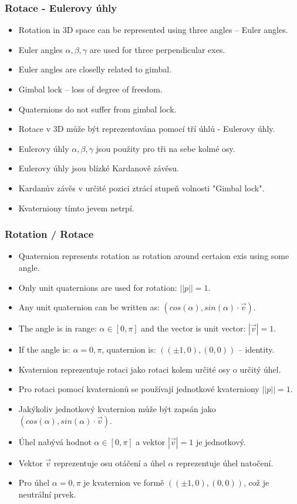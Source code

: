 \begin{frame}\frametitle{Rotace - Eulerovy úhly}\scriptsize
\begin{itemize}
\item Rotation in 3D space can be represented using three angles -- Euler angles.
\item Euler angles $\alpha,\beta,\gamma$ are used for three perpendicular exes.
\item Euler angles are closelly related to gimbal.
\item Gimbal lock -- loss of degree of freedom.
\item Quaternions do not suffer from gimbal lock.
\end{itemize}
\begin{itemize}
\item Rotace v 3D může být reprezentována pomocí tří úhlů - Eulerovy úhly.
\item Eulerovy úhly $\alpha,\beta,\gamma$ jsou použity pro tři na sebe kolmé osy.
\item Eulerovy úhly jsou blízké Kardanově závěsu.
\item Kardanův závěs v určité pozici ztrácí stupeň volnosti "Gimbal lock".
\item Kvaterniony tímto jevem netrpí.
\end{itemize}
\end{frame}

\begin{frame}\frametitle{Rotation / Rotace}\scriptsize
\begin{itemize}
\item Quaternion represents rotation as rotation around certaion exis using some angle.
\item Only unit quaternions are used for rotation: $||p||=1$.
\item Any unit quaternion can be written as: $(cos(\alpha),sin(\alpha)\cdot \vec v)$.
\item The angle is in range: $\alpha \in [0,\pi]$ and the vector is unit vector: $|\vec v|=1$.
\item If the angle is: $\alpha=0,\pi$, quaternion is: $((\pm 1,0),(0,0))$ -- identity.
\end{itemize}

\begin{itemize}
\item Kvaternion reprezentuje rotaci jako rotaci kolem určité osy o určitý úhel.
\item Pro rotaci pomocí kvaternionů se používají jednotkové kvaterniony $||p||=1$.
\item Jakýkoliv jednotkový kvaternion může být zapsán jako $(cos(\alpha),sin(\alpha)\cdot \vec v)$.
\item Úhel nabývá hodnot $\alpha \in [0,\pi]$ a vektor $|\vec v|=1$ je jednotkový.
\item Vektor $\vec v$ reprezentuje osu otáčení a úhel $\alpha$ reprezentuje úhel natočení.
\item Pro úhel $\alpha=0,\pi$ je kvaternion ve formě $((\pm 1,0),(0,0))$, což je neutrální prvek.
\end{itemize}
\end{frame}

